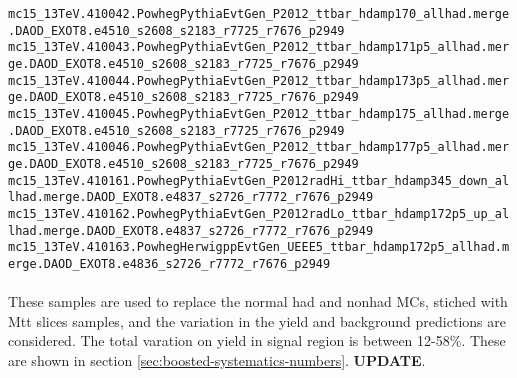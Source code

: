 {\verb|mc15_13TeV.410042.PowhegPythiaEvtGen_P2012_ttbar_hdamp170_allhad.merge.DAOD_EXOT8.e4510_s2608_s2183_r7725_r7676_p2949|\\
\verb|mc15_13TeV.410043.PowhegPythiaEvtGen_P2012_ttbar_hdamp171p5_allhad.merge.DAOD_EXOT8.e4510_s2608_s2183_r7725_r7676_p2949|\\
\verb|mc15_13TeV.410044.PowhegPythiaEvtGen_P2012_ttbar_hdamp173p5_allhad.merge.DAOD_EXOT8.e4510_s2608_s2183_r7725_r7676_p2949|\\
\verb|mc15_13TeV.410045.PowhegPythiaEvtGen_P2012_ttbar_hdamp175_allhad.merge.DAOD_EXOT8.e4510_s2608_s2183_r7725_r7676_p2949|\\
\verb|mc15_13TeV.410046.PowhegPythiaEvtGen_P2012_ttbar_hdamp177p5_allhad.merge.DAOD_EXOT8.e4510_s2608_s2183_r7725_r7676_p2949|\\
\verb|mc15_13TeV.410161.PowhegPythiaEvtGen_P2012radHi_ttbar_hdamp345_down_allhad.merge.DAOD_EXOT8.e4837_s2726_r7772_r7676_p2949|\\
\verb|mc15_13TeV.410162.PowhegPythiaEvtGen_P2012radLo_ttbar_hdamp172p5_up_allhad.merge.DAOD_EXOT8.e4837_s2726_r7772_r7676_p2949|\\
\verb|mc15_13TeV.410163.PowhegHerwigppEvtGen_UEEE5_ttbar_hdamp172p5_allhad.merge.DAOD_EXOT8.e4836_s2726_r7772_r7676_p2949|
}
\noindent

\paragraph{}
These \ttbar samples are used to replace the normal had and nonhad MCs, stiched with Mtt slices samples, and the variation in the \ttbar yield and background predictions are considered. The total varation on \ttbar yield in signal region is between 12-58\%. These are shown in section \ref{sec:boosted-systematics-numbers}. \textbf{UPDATE}.
